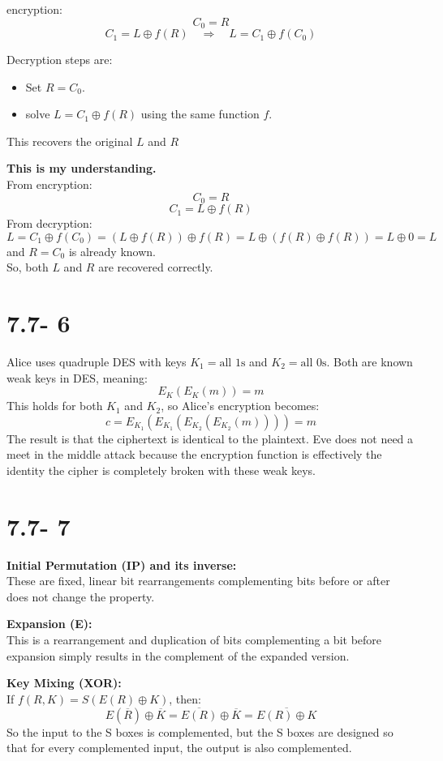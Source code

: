 \documentclass[12pt]{article}
\begin{document}
encryption:
\[
C_0 = R
\]
\[
C_1 = L \oplus f(R) \quad \Rightarrow \quad L = C_1 \oplus f(C_0)
\]

Decryption steps are:
\begin{itemize}
    \item Set \( R = C_0 \).
    \item solve \( L = C_1 \oplus f(R) \) using the same function \( f \).
\end{itemize}
This recovers the original \( L \) and \( R \)

\textbf{This is my understanding.}\\
From encryption:
\[
C_0 = R
\]
\[
C_1 = L \oplus f(R)
\]
From decryption:
\[
L = C_1 \oplus f(C_0) = (L \oplus f(R)) \oplus f(R) = L \oplus (f(R) \oplus f(R)) = L \oplus 0 = L
\]
and \( R = C_0 \) is already known. \\
So, both \( L \) and \( R \) are recovered correctly.




\newpage
\section*{7.7- 6}

Alice uses quadruple DES with keys \( K_1 = \text{all 1s} \) and \( K_2 = \text{all 0s} \). Both are known weak keys in DES, meaning:
\[
E_K(E_K(m)) = m
\]
This holds for both \( K_1 \) and \( K_2 \), so Alice's encryption becomes:
\[
c = E_{K_1}(E_{K_1}(E_{K_2}(E_{K_2}(m)))) = m
\]
The result is that the ciphertext is identical to the plaintext. 
Eve does not need a meet in the middle attack because the encryption
 function is effectively the identity the cipher is completely broken with these weak keys.

\newpage
\section*{7.7- 7}


\textbf{Initial Permutation (IP) and its inverse:} \\
These are fixed, linear bit rearrangements complementing bits before or after does not change the property.

\textbf{Expansion (E):} \\
This is a rearrangement and duplication of bits complementing a bit before expansion simply results in the complement of the expanded version.

\textbf{Key Mixing (XOR):} \\
If \( f(R, K) = S(E(R) \oplus K) \), then:
\[
E(\overline{R}) \oplus \overline{K} = \overline{E(R)} \oplus \overline{K} = \overline{E(R) \oplus K}
\]
So the input to the S boxes is complemented, but the S boxes are designed so that for every complemented input, the output is also complemented.
\end{document}
